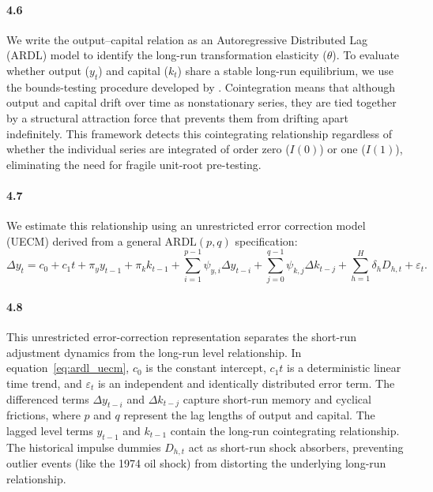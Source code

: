 \paragraph{4.6}
We write the output--capital relation as an Autoregressive Distributed Lag (ARDL) model to identify the long-run transformation elasticity ($\theta$). To evaluate whether output ($y_t$) and capital ($k_t$) share a stable long-run equilibrium, we use the bounds-testing procedure developed by \citet{Pesaran2001}. Cointegration means that although output and capital drift over time as nonstationary series, they are tied together by a structural attraction force that prevents them from drifting apart indefinitely. This framework detects this cointegrating relationship regardless of whether the individual series are integrated of order zero ($I(0)$) or one ($I(1)$), eliminating the need for fragile unit-root pre-testing.

\paragraph{4.7}
We estimate this relationship using an unrestricted error correction model (UECM) derived from a general $\text{ARDL}(p, q)$ specification:
\begin{equation}
\Delta y_t = c_0 + c_1 t + \pi_y y_{t-1} + \pi_k k_{t-1} + \sum_{i=1}^{p-1} \psi_{y,i} \Delta y_{t-i} + \sum_{j=0}^{q-1} \psi_{k,j} \Delta k_{t-j} + \sum_{h=1}^{H} \delta_h D_{h,t} + \varepsilon_t .
\label{eq:ardl_uecm}
\end{equation}

\paragraph{4.8}
This unrestricted error-correction representation separates the short-run adjustment dynamics from the long-run level relationship. In equation~\eqref{eq:ardl_uecm}, $c_0$ is the constant intercept, $c_1 t$ is a deterministic linear time trend, and $\varepsilon_t$ is an independent and identically distributed error term. The differenced terms $\Delta y_{t-i}$ and $\Delta k_{t-j}$ capture short-run memory and cyclical frictions, where $p$ and $q$ represent the lag lengths of output and capital. The lagged level terms $y_{t-1}$ and $k_{t-1}$ contain the long-run cointegrating relationship. The historical impulse dummies $D_{h,t}$ act as short-run shock absorbers, preventing outlier events (like the 1974 oil shock) from distorting the underlying long-run relationship.

